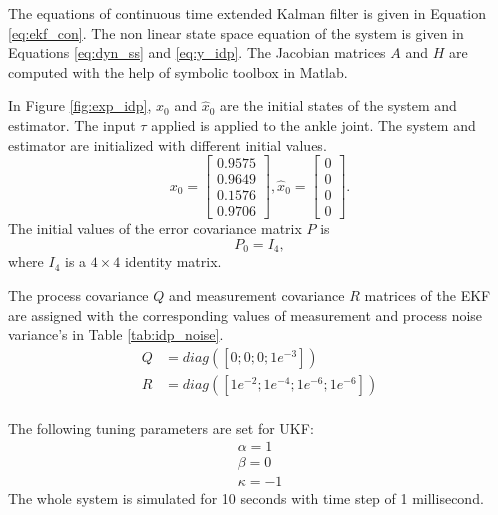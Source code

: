  The equations of continuous time extended Kalman filter is given in Equation \ref{eq:ekf_con}. The non linear state space equation of the system is given in Equations \ref{eq:dyn_ss} and \ref{eq:y_idp}. The Jacobian matrices $A$ and $H$ are computed with the help of symbolic toolbox in Matlab.

In Figure \ref{fig:exp_idp}, $x_0$ and $\hat x_0$ are the initial states of the system and estimator. The input $\tau$ applied is applied to the ankle joint. The system and estimator are initialized with different initial values. 
$$ x_0 = \begin{bmatrix} 0.9575 \\ 0.9649\\ 0.1576\\ 0.9706 \end{bmatrix}, \hat x_0 = \begin{bmatrix} 0 \\ 0\\ 0\\ 0 \end{bmatrix}.$$  
The initial values of the error covariance matrix $P$ is $$P_0 = I_4, $$ where $I_4$ is a $4 \times 4$ identity matrix.


The process covariance $Q$ and measurement covariance $R$ matrices of the EKF are assigned with the corresponding values of measurement and process noise variance's in Table \ref{tab:idp_noise}.
$$  \begin{aligned}
    Q&=diag([0; 0; 0; 1e^{-3}]) \\
    R&=diag([1e^{-2}; 1e^{-4}; 1e^{-6}; 1e^{-6}]) \\
    \end{aligned}
    $$

The following tuning parameters are set for UKF:
$$  \begin{aligned}
    \alpha = 1 \\
    \beta = 0\\
    \kappa = -1 
    \end{aligned} $$ 
The whole system is simulated for 10 seconds with time step of 1 millisecond.
